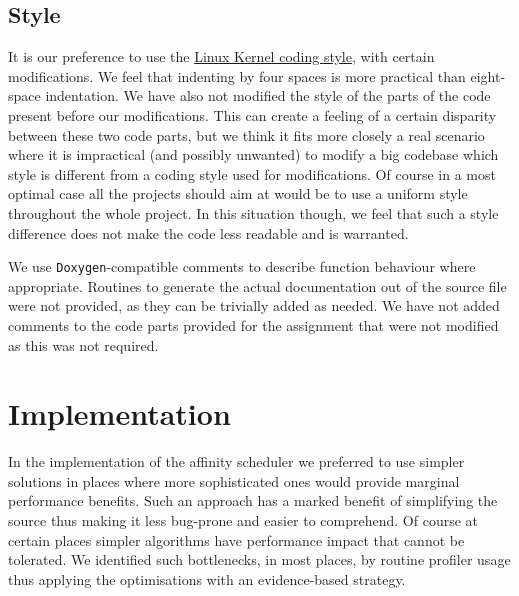 \documentclass[11pt,a4paper]{article}
\begin{document}
\subsection{Style}
It is our preference to use the \href{https://www.kernel.org/doc/Documentation/CodingStyle}{Linux Kernel coding style}, with certain modifications. 
We feel that indenting by four spaces is more practical than eight-space indentation. 
We have also not modified the style of the parts of the code present before our modifications.
This can create a feeling of a certain disparity between these two code parts, but we think it fits more closely a real scenario where it is impractical (and possibly unwanted) to modify a big codebase which style is different from a coding style used for modifications.
Of course in a most optimal case all the projects should aim at would be to use a uniform style throughout the whole project.
In this situation though, we feel that such a style difference does not make the code less readable and is warranted.

We use \texttt{Doxygen}-compatible comments to describe function behaviour where appropriate. 
Routines to generate the actual documentation out of the source file were not provided, as they can be trivially added as needed.
We have not added comments to the code parts provided for the assignment that were not modified as this was not required.

\section{Implementation}
In the implementation of the affinity scheduler we preferred to use simpler solutions in places where more sophisticated ones would provide marginal performance benefits.
Such an approach has a marked benefit of simplifying the source thus making it less bug-prone and easier to comprehend.
Of course at certain places simpler algorithms have performance impact that cannot be tolerated.
We identified such bottlenecks, in most places, by routine profiler usage thus applying the optimisations with an evidence-based strategy.
\end{document}
